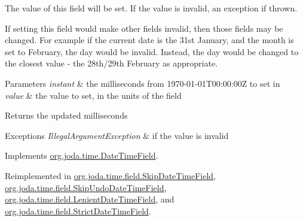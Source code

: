 The value of this field will be set. If the value is invalid, an exception if thrown. 

If setting this field would make other fields invalid, then those fields may be changed. For example if the current date is the 31st January, and the month is set to February, the day would be invalid. Instead, the day would be changed to the closest value -\/ the 28th/29th February as appropriate.


\begin{DoxyParams}{Parameters}
{\em instant} & the milliseconds from 1970-\/01-\/01\-T00\-:00\-:00\-Z to set in \\
\hline
{\em value} & the value to set, in the units of the field \\
\hline
\end{DoxyParams}
\begin{DoxyReturn}{Returns}
the updated milliseconds 
\end{DoxyReturn}

\begin{DoxyExceptions}{Exceptions}
{\em Illegal\-Argument\-Exception} & if the value is invalid \\
\hline
\end{DoxyExceptions}


Implements \hyperlink{classorg_1_1joda_1_1time_1_1_date_time_field_a1b5df9ceb6dc4a400e6d77b64ccf4c13}{org.\-joda.\-time.\-Date\-Time\-Field}.



Reimplemented in \hyperlink{classorg_1_1joda_1_1time_1_1field_1_1_skip_date_time_field_ae3c99a20cba5d0e5efba6fd798f4b6cd}{org.\-joda.\-time.\-field.\-Skip\-Date\-Time\-Field}, \hyperlink{classorg_1_1joda_1_1time_1_1field_1_1_skip_undo_date_time_field_ab349f12255fdf7f7d904066eb3267b7e}{org.\-joda.\-time.\-field.\-Skip\-Undo\-Date\-Time\-Field}, \hyperlink{classorg_1_1joda_1_1time_1_1field_1_1_lenient_date_time_field_a6fb7abba6bccf10aeee3f5e16705c91a}{org.\-joda.\-time.\-field.\-Lenient\-Date\-Time\-Field}, and \hyperlink{classorg_1_1joda_1_1time_1_1field_1_1_strict_date_time_field_aa3b06664937c7804feb504305b9ae0e9}{org.\-joda.\-time.\-field.\-Strict\-Date\-Time\-Field}.

